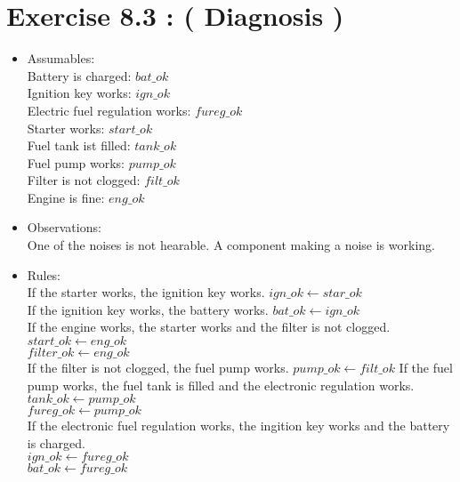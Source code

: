 \documentclass[12pt,a4paper]{article}
\begin{document}
\section*{Exercise 8.3 : ( Diagnosis )}
\begin{itemize}
\item Assumables:\\
    Battery is charged: $ bat\_ok $ \\
    Ignition key works: $ ign\_ok $ \\
    Electric fuel regulation works: $ fureg\_ok $ \\
    Starter works: $ start\_ok $ \\
    Fuel tank ist filled: $ tank\_ok $ \\
    Fuel pump works: $ pump\_ok $ \\
    Filter is not clogged: $ filt\_ok $ \\
    Engine is fine: $ eng\_ok $ \\
\item Observations: \\
    One of the noises is not hearable. A component making a noise is working.
\item Rules: \\
    If the starter works, the ignition key works.
    $ ign\_ok \leftarrow star\_ok $ \\
    If the ignition key works, the battery works.
    $ bat\_ok \leftarrow ign\_ok $ \\
    If the engine works, the starter works and the filter is not clogged. \\
    $ start\_ok \leftarrow eng\_ok $ \\
    $ filter\_ok \leftarrow eng\_ok $ \\
    If the filter is not clogged, the fuel pump works.
    $ pump\_ok \leftarrow filt\_ok $
    If the fuel pump works, the fuel tank is filled and the electronic regulation works.\\
    $ tank\_ok \leftarrow pump\_ok $ \\
    $ fureg\_ok \leftarrow pump\_ok $ \\
    If the electronic fuel regulation works, the ingition key works and the battery is charged.\\
    $ ign\_ok \leftarrow fureg\_ok $ \\
    $ bat\_ok \leftarrow fureg\_ok $ \\
\end{itemize}
\end{document}
